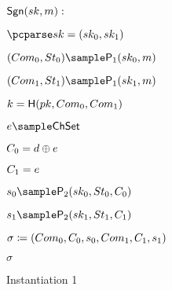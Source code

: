 \begin{center}
\begin{figure}[htb!]
{\begin{minipage}[t]{0.51\textwidth}
                       
        \end{minipage}
        \begin{minipage}[t]{0.5\textwidth}
            \underline{$\mathsf{Sgn}(sk,m):$}
            \begin{nicodemus}
            	\item $\pcparse \sk = (\sk_0,\sk_1) $
            	\item	$(\com_0,\st_0)\sample\IDP_1(\sk_0,\m)$
		\item $(\com_1,\st_1)\sample\IDP_1(\sk_1,\m)$ 
		\item $ k = \mathsf{H}(pk,Com_0,Com_1) $
  		\item $ e \sample \ChSet$
		\item $ C_0 = d\oplus e $
		\item $C_1 = e$  
		\item $\s_0 \sample\IDP_2(\sk_0,\st_0,\c_0)$
		\item $ \s_1 \sample\IDP_2(\sk_1,\st_1,\c_1)$
		\item $\sigma \coloneqq (Com_0,C_0,s_0, Com_1, C_1,s_1)$
		\item \pcreturn $\sigma$
            \end{nicodemus}

        \end{minipage}

    }
    \caption{Instantiation 1}
    \label{fig:prf-security}
\end{figure}
\end{center}


